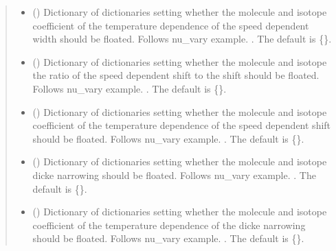 \documentclass[letterpaper,10pt,english]{sphinxmanual}
\begin{document}
\begin{fulllineitems}
\begin{fulllineitems}
\begin{quote}
\begin{description}
\begin{itemize}
\item {} 
\sphinxAtStartPar
{} (\sphinxstyleliteralemphasis{\sphinxupquote{, }}) \textendash{} Dictionary of dictionaries setting whether the molecule and isotope coefficient of the temperature dependence of the speed dependent width should be floated.  Follows nu\_vary example.  . The default is \{\}.

\item {} 
\sphinxAtStartPar
{} (\sphinxstyleliteralemphasis{\sphinxupquote{, }}) \textendash{} Dictionary of dictionaries setting whether the molecule and isotope the ratio of the speed dependent shift to the shift should be floated.  Follows nu\_vary example.  . The default is \{\}.

\item {} 
\sphinxAtStartPar
{} (\sphinxstyleliteralemphasis{\sphinxupquote{, }}) \textendash{} Dictionary of dictionaries setting whether the molecule and isotope coefficient of the temperature dependence of the speed dependent shift should be floated.  Follows nu\_vary example.  . The default is \{\}.

\item {} 
\sphinxAtStartPar
{} (\sphinxstyleliteralemphasis{\sphinxupquote{, }}) \textendash{} Dictionary of dictionaries setting whether the molecule and isotope dicke narrowing should be floated.  Follows nu\_vary example.  . The default is \{\}.

\item {} 
\sphinxAtStartPar
{} (\sphinxstyleliteralemphasis{\sphinxupquote{, }}) \textendash{} Dictionary of dictionaries setting whether the molecule and isotope  coefficient of the temperature dependence of the dicke narrowing should be floated.  Follows nu\_vary example.  . The default is \{\}.


\end{itemize}
\end{description}
\end{quote}
\end{fulllineitems}
\end{fulllineitems}
\end{document}
